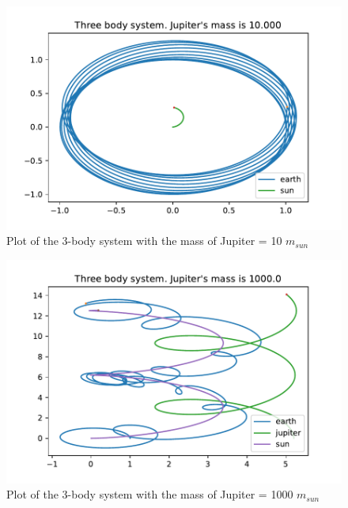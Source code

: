 \begin{figure}[H]
	\includegraphics[width=0.9\linewidth]{../results/plots/Jupitermass_is_10_000}
	\caption{Plot of the 3-body system with the mass of Jupiter = 10 $ m_{sun} $}
	\label{fig:jupitermassis10}
\end{figure}

\begin{figure}[H]
	\centering
	\includegraphics[width=0.9\linewidth]{../results/plots/Jupitermass_is_10000_earth}
	\caption{Plot of the 3-body system with the mass of Jupiter = 1000 $ m_{sun} $}
	\label{fig:jupitermassis10000earth}
\end{figure}





